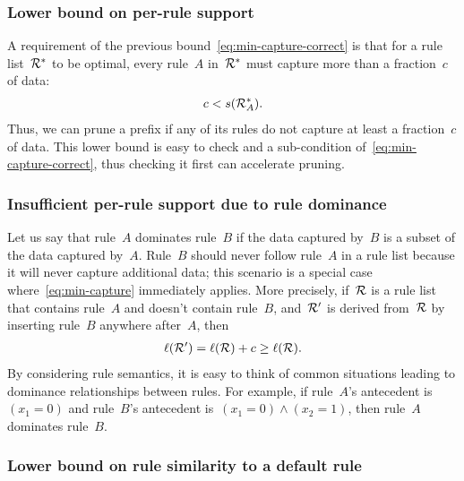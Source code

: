 \subsubsection{Lower bound on per-rule support}

A requirement of the previous bound~\eqref{eq:min-capture-correct}
is that for a rule list~${\mathcal R}^*$ to be optimal, every rule~$A$ in~${\mathcal R}^*$ must
capture more than a fraction~$c$ of data:
\begin{align}
c < s(\RL_A^*).
\label{eq:min-capture}
\end{align}
Thus, we can prune a prefix if any of its rules do not capture at least
a fraction~$c$ of data.
%
This lower bound is easy to check and a sub-condition of~\eqref{eq:min-capture-correct},
thus checking it first can accelerate pruning.

\subsubsection{Insufficient per-rule support due to rule dominance}

Let us say that rule~$A$ dominates rule~$B$ if the data captured by~$B$ is a subset of the data captured by~$A$.
%
Rule~$B$ should never follow rule~$A$ in a rule list because it will never capture additional data;
this scenario is a special case where~\eqref{eq:min-capture} immediately applies.
%
More precisely, if~${\mathcal R}$ is a rule list that contains rule~$A$ and doesn't contain rule~$B$,
and~${\mathcal R}'$ is derived from~${\mathcal R}$ by inserting rule~$B$ anywhere after~$A$, then
\begin{align}
\ell(\RL') = \ell(\RL) + c \ge \ell(\RL).
\end{align}
By considering rule semantics, it is easy to think of common situations
leading to dominance relationships between rules.
%
For example, if rule~$A$'s antecedent is~${(x_1 = 0)}$ and rule~$B$'s
antecedent is~${(x_1 = 0) \wedge (x_2 = 1)}$, then rule~$A$ dominates rule~$B$.
%

\subsubsection{Lower bound on rule similarity to a default rule}

